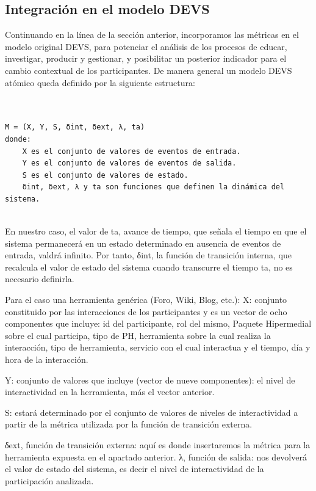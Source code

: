 \subsection{Integración en el modelo DEVS}  

Continuando en la línea de la sección anterior, incorporamos las métricas en el modelo original DEVS, para potenciar el análisis de los procesos de educar, investigar, producir y gestionar, y posibilitar un posterior indicador para el cambio contextual de los participantes.
De manera general un modelo DEVS atómico queda definido por la siguiente estructura:


\begin{verbatim}
 

M = (X, Y, S, δint, δext, λ, ta)
donde:
	X es el conjunto de valores de eventos de entrada.
	Y es el conjunto de valores de eventos de salida.
	S es el conjunto de valores de estado.
	δint, δext, λ y ta son funciones que definen la dinámica del sistema.
 
\end{verbatim}

En nuestro caso, el valor de ta, avance de tiempo, que señala el tiempo en que el sistema permanecerá en un estado determinado en ausencia de eventos de entrada, valdrá infinito. Por tanto, δint, la función de transición interna, que recalcula el valor de estado del sistema cuando transcurre el tiempo ta, no es necesario definirla.

Para el caso una herramienta genérica (Foro, Wiki, Blog, etc.):
X: conjunto constituido por las interacciones de los participantes y es un vector de ocho componentes que incluye: id del participante, rol del mismo, Paquete Hipermedial sobre el cual participa, tipo de PH, herramienta sobre la cual realiza la interacción, tipo de herramienta, servicio con el cual interactua y el tiempo, día y hora de la interacción.

Y: conjunto de valores que incluye (vector de nueve componentes): el nivel de interactividad en la herramienta, más el vector anterior.

S: estará determinado por el conjunto de valores de niveles de interactividad a partir de la métrica utilizada por la función de transición externa. 

δext, función de transición externa: aquí es donde insertaremos la métrica para la herramienta expuesta en el apartado anterior.
λ, función de salida: nos devolverá el valor de estado del sistema, es decir el nivel de interactividad de la participación analizada.

